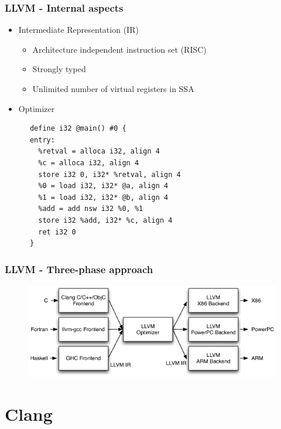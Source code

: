 \documentclass{beamer}
\begin{document}
\begin{frame}[fragile]
\frametitle{LLVM - Internal aspects}
\begin{itemize}
  \item Intermediate Representation (IR)
  \begin{itemize}
    \item Architecture independent instruction set (RISC)
    \item Strongly typed
    \item Unlimited number of virtual registers in SSA
  \end{itemize}
  \item Optimizer
\end{itemize}

\begin{lstlisting}
      define i32 @main() #0 {
      entry:
        %retval = alloca i32, align 4
        %c = alloca i32, align 4
        store i32 0, i32* %retval, align 4
        %0 = load i32, i32* @a, align 4
        %1 = load i32, i32* @b, align 4
        %add = add nsw i32 %0, %1
        store i32 %add, i32* %c, align 4
        ret i32 0
      }
\end{lstlisting}

\end{frame}

\begin{frame}
\frametitle{LLVM - Three-phase approach}
\begin{figure}
\includegraphics[width=0.8\linewidth]{img/llvm_struct.png}
\end{figure}
\end{frame}
\section{Clang}
\end{document}
